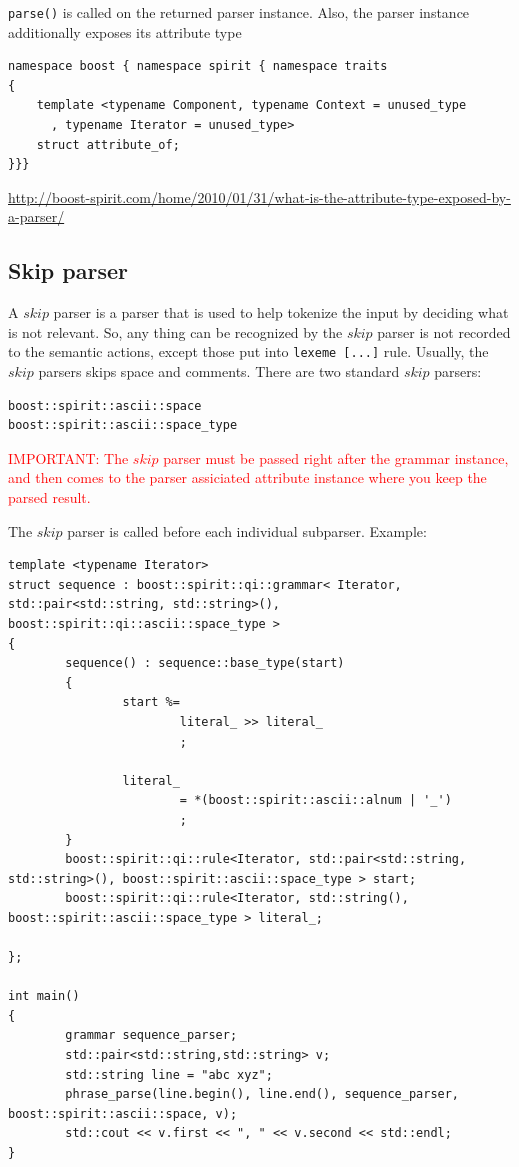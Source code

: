 \verb!parse()! is called on the returned parser instance. Also, the parser
instance additionally exposes its attribute type
\begin{verbatim}
namespace boost { namespace spirit { namespace traits
{
    template <typename Component, typename Context = unused_type
      , typename Iterator = unused_type>
    struct attribute_of;
}}}
\end{verbatim}
\url{http://boost-spirit.com/home/2010/01/31/what-is-the-attribute-type-exposed-by-a-parser/}

\subsection{Skip parser}
\label{sec:skip_parser}

A $skip$ parser is a parser that is used to help tokenize the input by deciding
what is not relevant. So, any thing can be recognized by the $skip$ parser is
not recorded to the semantic actions, except those put into \verb!lexeme [...]!
rule. Usually, the $skip$ parsers skips space and comments. There are two
standard $skip$ parsers:
\begin{verbatim}
boost::spirit::ascii::space
boost::spirit::ascii::space_type
\end{verbatim}
\textcolor{red}{IMPORTANT: The $skip$ parser must be passed right after the
grammar instance, and then comes to the parser assiciated attribute instance
where you keep the parsed result.}

The $skip$ parser is called before each individual subparser.
Example:
\begin{lstlisting}
template <typename Iterator>
struct sequence : boost::spirit::qi::grammar< Iterator,
std::pair<std::string, std::string>(),
boost::spirit::qi::ascii::space_type >
{
        sequence() : sequence::base_type(start)
        {
                start %=
                        literal_ >> literal_
                        ;

                literal_
                        = *(boost::spirit::ascii::alnum | '_')
                        ;
        }
        boost::spirit::qi::rule<Iterator, std::pair<std::string,
std::string>(), boost::spirit::ascii::space_type > start;
        boost::spirit::qi::rule<Iterator, std::string(),
boost::spirit::ascii::space_type > literal_;

};

int main()
{
        grammar sequence_parser;
        std::pair<std::string,std::string> v;
        std::string line = "abc xyz";
        phrase_parse(line.begin(), line.end(), sequence_parser,
boost::spirit::ascii::space, v);
        std::cout << v.first << ", " << v.second << std::endl;
}
\end{lstlisting}


